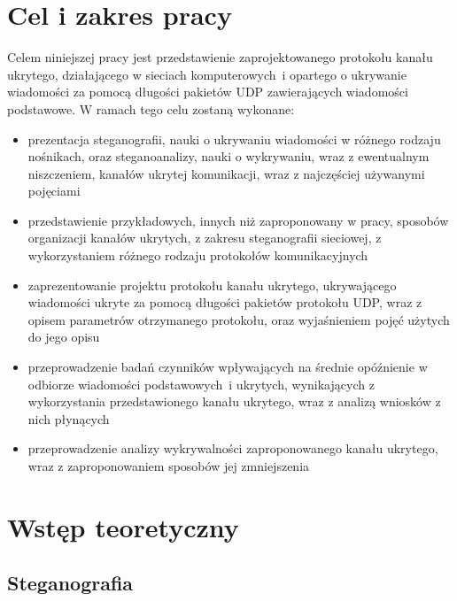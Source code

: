 \documentclass[a4paper, twoside, 12pt]{report}
\begin{document}
\tableofcontents

\listoffigures

\chapter{Cel i zakres pracy}
    Celem niniejszej pracy jest przedstawienie zaprojektowanego protokołu kanału
    ukrytego, działającego w sieciach komputerowych~i  opartego o ukrywanie wiadomości za pomocą długości pakietów UDP
    zawierających wiadomości podstawowe. W ramach tego celu zostaną wykonane:
    \begin{itemize}
        \item prezentacja steganografii, nauki o ukrywaniu wiadomości w różnego rodzaju nośnikach,
            oraz steganoanalizy, nauki o wykrywaniu, wraz z ewentualnym niszczeniem, kanałów
            ukrytej komunikacji, wraz z najczęściej używanymi pojęciami
        \item przedstawienie przykładowych, innych niż zaproponowany w pracy,
            sposobów organizacji kanałów ukrytych, z zakresu steganografii sieciowej,
            z wykorzystaniem różnego rodzaju protokołów komunikacyjnych
        \item zaprezentowanie projektu protokołu kanału ukrytego, ukrywającego
            wiadomości ukryte za pomocą długości pakietów protokołu UDP, wraz
            z opisem parametrów otrzymanego protokołu, oraz wyjaśnieniem pojęć
            użytych do jego opisu
        \item przeprowadzenie badań czynników wpływających na średnie opóźnienie
            w odbiorze wiadomości podstawowych~i ukrytych, wynikających z wykorzystania
            przedstawionego kanału ukrytego, wraz z analizą wniosków
            z nich płynących
        \item przeprowadzenie analizy wykrywalności zaproponowanego kanału ukrytego,
            wraz z zaproponowaniem sposobów jej zmniejszenia
    \end{itemize}

\chapter{Wstęp teoretyczny}
    \section{Steganografia}
\end{document}
